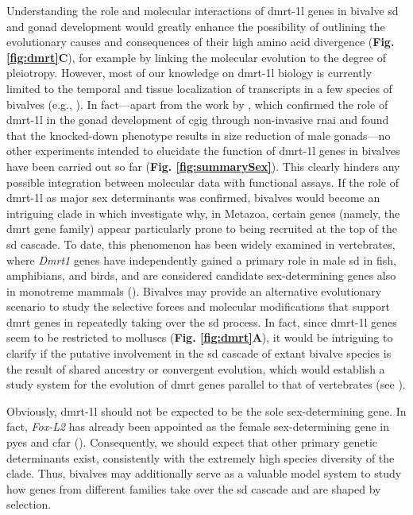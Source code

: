 Understanding the role and molecular interactions of \gls{dmrt-1l} genes in bivalve \gls{sd} and gonad development would greatly enhance the possibility of outlining the evolutionary causes and consequences of their high amino acid divergence (\textbf{Fig. \ref{fig:dmrt}C}), for example by linking the molecular evolution to the degree of pleiotropy. However, most of our knowledge on \gls{dmrt-1l} biology is currently limited to the temporal and tissue localization of transcripts in a few species of bivalves (e.g., \textbf{\cite{li2018foxl2,yue2021variance}}). In fact—apart from the work by \textbf{\cite{sun2022examination}}, which confirmed the role of \gls{dmrt-1l} in the gonad development of \gls{cgig} through non-invasive \gls{rnai} and found that the knocked-down phenotype results in size reduction of male gonads—no other experiments intended to elucidate the function of \gls{dmrt-1l} genes in bivalves have been carried out so far (\textbf{Fig. \ref{fig:summarySex}}). This clearly hinders any possible integration between molecular data with functional assays.
If the role of \gls{dmrt-1l} as major sex determinants was confirmed, bivalves would become an intriguing clade in which investigate why, in Metazoa, certain genes (namely, the \gls{dmrt} gene family) appear particularly prone to being recruited at the top of the \gls{sd} cascade. To date, this phenomenon has been widely examined in vertebrates, where \textit{Dmrt1} genes have independently gained a primary role in male \gls{sd} in fish, amphibians, and birds, and are considered candidate sex-determining genes also in monotreme mammals (\textbf{\cite{marshall2010homologies,beukeboom2014evolution,mawaribuchi2019independent}}). Bivalves may provide an alternative evolutionary scenario to study the selective forces and molecular modifications that support \gls{dmrt} genes in repeatedly taking over the \gls{sd} process. In fact, since \gls{dmrt-1l} genes seem to be restricted to molluscs (\textbf{Fig. \ref{fig:dmrt}A}), it would be intriguing to clarify if the putative involvement in the \gls{sd} cascade of extant bivalve species is the result of shared ancestry or convergent evolution, which would establish a study system for the evolution of \gls{dmrt} genes parallel to that of vertebrates (see \textbf{\cite{capel2017vertebrate}}).

Obviously, \gls{dmrt-1l} should not be expected to be the sole sex-determining gene. In fact, \textit{Fox-L2} has already been appointed as the female sex-determining gene in \gls{pyes} and \gls{cfar} (\textbf{\cite{han2022ancient}}). Consequently, we should expect that other primary genetic determinants exist, consistently with the extremely high species diversity of the clade. Thus, bivalves may additionally serve as a valuable model system to study how genes from different families take over the \gls{sd} cascade and are shaped by selection.

